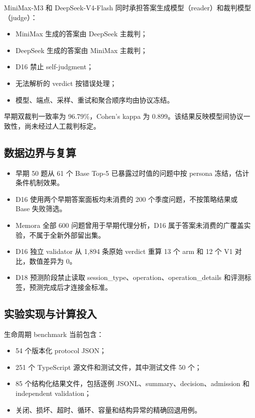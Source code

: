 MiniMax-M3 和 DeepSeek-V4-Flash 同时承担答案生成模型（reader）和裁判模型（judge）：

\begin{itemize}
\item MiniMax 生成的答案由 DeepSeek 主裁判；
\item DeepSeek 生成的答案由 MiniMax 主裁判；
\item D16 禁止 self-judgment；
\item 无法解析的 verdict 按错误处理；
\item 模型、端点、采样、重试和聚合顺序均由协议冻结。
\end{itemize}

早期双裁判一致率为 96.79\%，Cohen's kappa 为 0.899。该结果反映模型间协议一致性，尚未经过人工裁判标定。

\subsection{数据边界与复算}

\begin{itemize}
\item 早期 50 题从 61 个 Base Top-5 已暴露过时值的问题中按 persona 冻结，估计条件机制效果。
\item D16 使用两个早期答案面板均未消费的 200 个季度问题，不按策略结果或 Base 失败筛选。
\item Memora 全部 600 问题曾用于早期代理分析，D16 属于答案未消费的广覆盖实验，不属于全新外部留出集。
\item D16 独立 validator 从 1,894 条原始 verdict 重算 13 个 arm 和 12 个 V1 对比，数值差异为 0。
\item D18 预测阶段禁止读取 session\_type、operation、operation\_details 和评测标签，预测完成后才连接金标准。
\end{itemize}

\subsection{实验实现与计算投入}

生命周期 benchmark 当前包含：

\begin{itemize}
\item 54 个版本化 protocol JSON；
\item 251 个 TypeScript 源文件和测试文件，其中测试文件 50 个；
\item 85 个结构化结果文件，包括逐例 JSONL、summary、decision、admission 和 independent validation；
\item 关闭、损坏、超时、循环、容量和结构异常的精确回退用例。
\end{itemize}

